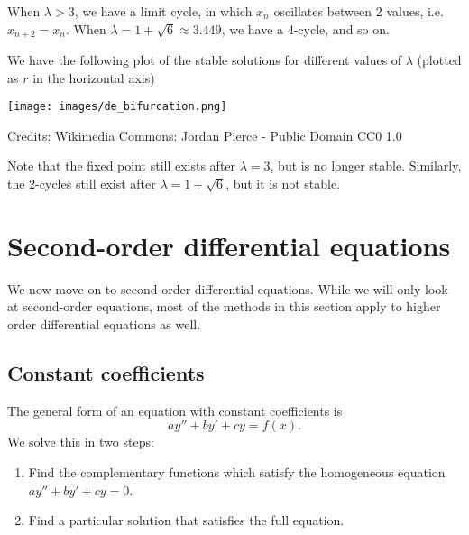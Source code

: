 \documentclass[a4paper]{article}
\begin{document}
When $\lambda > 3$, we have a limit cycle, in which $x_n$ oscillates between 2 values, i.e.\ $x_{n + 2} = x_n$. When $\lambda = 1 + \sqrt{6} \approx 3.449$, we have a 4-cycle, and so on.
\begin{center}
\end{center}
We have the following plot of the stable solutions for different values of $\lambda$ (plotted as $r$ in the horizontal axis)
\begin{center}
  \texttt{[image: images/de\_bifurcation.png]}

  Credits: Wikimedia Commons: Jordan Pierce - Public Domain CC0 1.0
\end{center}
Note that the fixed point still exists after $\lambda = 3$, but is no longer stable. Similarly, the 2-cycles still exist after $\lambda = 1 + \sqrt{6}$, but it is not stable.

\section{Second-order differential equations}
We now move on to second-order differential equations. While we will only look at second-order equations, most of the methods in this section apply to higher order differential equations as well.
\subsection{Constant coefficients}
The general form of an equation with constant coefficients is
\[
  ay'' + by' + cy = f(x).
\]
We solve this in two steps:
\begin{enumerate}
  \item Find the complementary functions which satisfy the homogeneous equation $ay'' + by' + cy = 0$.
  \item Find a particular solution that satisfies the full equation.
\end{enumerate}
\end{document}
